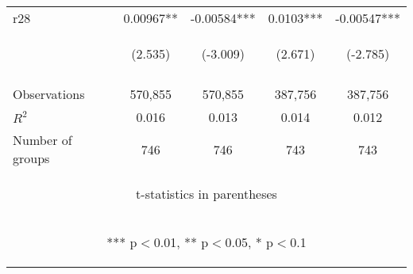 \documentclass[]{article}
\begin{document}
\begin{center}
\begin{tabular}{lcccc}
r28 & 0.00967** & -0.00584*** & 0.0103*** & -0.00547*** \\
 & \begin{footnotesize}(2.535)\end{footnotesize} & \begin{footnotesize}(-3.009)\end{footnotesize} & \begin{footnotesize}(2.671)\end{footnotesize} & \begin{footnotesize}(-2.785)\end{footnotesize} \\
\vspace{4pt} & \begin{footnotesize}\end{footnotesize} & \begin{footnotesize}\end{footnotesize} & \begin{footnotesize}\end{footnotesize} & \begin{footnotesize}\end{footnotesize} \\
Observations & 570,855 & 570,855 & 387,756 & 387,756 \\
$R^2$ & 0.016 & 0.013 & 0.014 & 0.012 \\
 Number of groups & 746 & 746 & 743 & 743 \\ \hline
\multicolumn{5}{c}{\begin{footnotesize} t-statistics in parentheses\end{footnotesize}} \\
\multicolumn{5}{c}{\begin{footnotesize} *** p$<$0.01, ** p$<$0.05, * p$<$0.1\end{footnotesize}} \\
\end{tabular}
\end{center}
\end{document}
